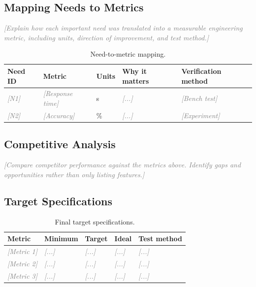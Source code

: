 \documentclass[11pt,letterpaper]{article}
\newcommand{\placeholder}[1]{\textcolor{gray}{\textit{[#1]}}}
\begin{document}
\subsection{Mapping Needs to Metrics}
\placeholder{Explain how each important need was translated into a measurable
engineering metric, including units, direction of improvement, and test method.}

\begin{table}[H]
\centering
\caption{Need-to-metric mapping.}
\label{tab:need-metric}
\begin{tabularx}{\textwidth}{lYYYY}
\toprule
\textbf{Need ID} & \textbf{Metric} & \textbf{Units} & \textbf{Why it matters} &
\textbf{Verification method} \\
\midrule
\placeholder{N1} & \placeholder{Response time} & \si{\second} &
\placeholder{...} & \placeholder{Bench test} \\
\placeholder{N2} & \placeholder{Accuracy} & \si{\percent} &
\placeholder{...} & \placeholder{Experiment} \\
\bottomrule
\end{tabularx}
\end{table}

\subsection{Competitive Analysis}
\placeholder{Compare competitor performance against the metrics above. Identify
gaps and opportunities rather than only listing features.}

\subsection{Target Specifications}
\begin{table}[H]
\centering
\caption{Final target specifications.}
\label{tab:specifications}
\begin{tabularx}{\textwidth}{lYYYY}
\toprule
\textbf{Metric} & \textbf{Minimum} & \textbf{Target} & \textbf{Ideal} &
\textbf{Test method} \\
\midrule
\placeholder{Metric 1} & \placeholder{...} & \placeholder{...} &
\placeholder{...} & \placeholder{...} \\
\placeholder{Metric 2} & \placeholder{...} & \placeholder{...} &
\placeholder{...} & \placeholder{...} \\
\placeholder{Metric 3} & \placeholder{...} & \placeholder{...} &
\placeholder{...} & \placeholder{...} \\
\bottomrule
\end{tabularx}
\end{table}
\end{document}
